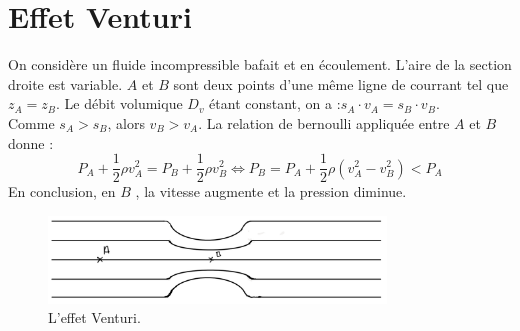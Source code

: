 \section{Effet Venturi}


On considère un fluide incompressible bafait et en écoulement. L'aire de la section droite est variable. \( A\) et \(B\) sont deux points d'une même ligne de courrant tel que \(z_{A} = z_{B}\). Le débit volumique \(D_{v}\) étant constant, on a :\(s_{A} \cdot v_{A} = s_{B} \cdot v_{B}\).\\
Comme \(s_{A}>s_{B}\), alors \(v_{B}>v_{A}\). La relation de bernoulli appliquée entre \(A\) et \(B\) donne : \\
\[
    P_{A} +\frac{1}{2}\rho v_{A}^{2} = P_{B} +\frac{1}{2}\rho v_{B}^{2} \iff P_{B} = P_{A} + \frac{1}{2}\rho (v_{A}^{2} - v_{B}^{2})<P_{A}
\]
En conclusion, en \(B\) , la vitesse augmente et la pression diminue.
\begin{figure}[!htb]
    \centering
    \includegraphics[width=0.8\textwidth]{SchemaVen.png}
    \caption{L'effet Venturi.}
    \label{fig:SchemaVen}
\end{figure}
